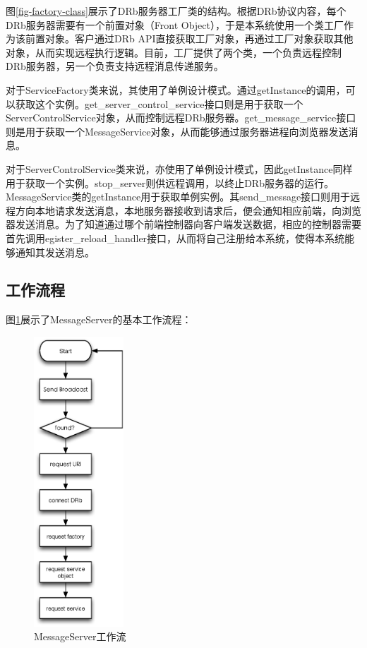 图\ref{fig-factory-class}展示了DRb服务器工厂类的结构。根据DRb协议内容，每个DRb服务器需要有一个前置对象（Front Object），于是本系统使用一个类工厂作为该前置对象。客户通过DRb API直接获取工厂对象，再通过工厂对象获取其他对象，从而实现远程执行逻辑。目前，工厂提供了两个类，一个负责远程控制DRb服务器，另一个负责支持远程消息传递服务。

对于ServiceFactory类来说，其使用了单例设计模式。通过getInstance的调用，可以获取这个实例。get\_server\_control\_service接口则是用于获取一个ServerControlService对象，从而控制远程DRb服务器。get\_message\_service接口则是用于获取一个MessageService对象，从而能够通过服务器进程向浏览器发送消息。

对于ServerControlService类来说，亦使用了单例设计模式，因此getInstance同样用于获取一个实例。stop\_server则供远程调用，以终止DRb服务器的运行。MessageService类的getInstance用于获取单例实例。其send\_message接口则用于远程方向本地请求发送消息，本地服务器接收到请求后，便会通知相应前端，向浏览器发送消息。为了知道通过哪个前端控制器向客户端发送数据，相应的控制器需要首先调用egister\_reload\_handler接口，从而将自己注册给本系统，使得本系统能够通知其发送消息。

\subsection{工作流程}
图\ref{fig-msg-process}展示了MessageServer的基本工作流程：
\begin{figure}[h]
\centering
\includegraphics[width=0.3\textwidth]{images/detail/message_server_process.eps}
\caption{MessageServer工作流}
\label{fig-msg-process}
\end{figure}

